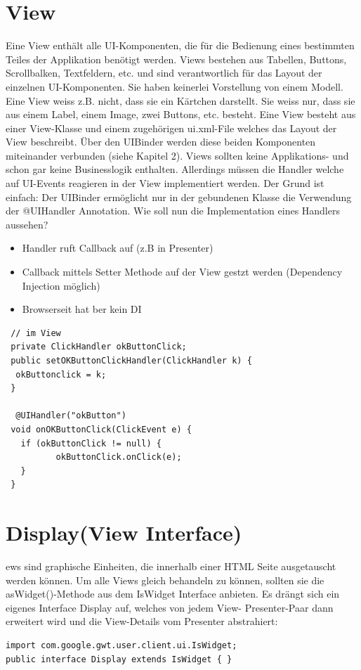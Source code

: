 \documentclass[a4paper,10pt]{scrreprt}
\begin{document}
\section{View}
Eine View enthält alle UI-Komponenten, die für die Bedienung eines bestimmten Teiles der
Applikation benötigt werden. Views bestehen aus Tabellen, Buttons, Scrollbalken, Textfeldern, etc.
und sind verantwortlich für das Layout der einzelnen UI-Komponenten. Sie haben keinerlei Vorstellung
von einem Modell. Eine View weiss z.B. nicht, dass sie ein Kärtchen darstellt. Sie weiss nur, dass sie aus
einem Label, einem Image, zwei Buttons, etc. besteht.
Eine View besteht aus einer View-Klasse und einem zugehörigen ui.xml-File welches das Layout der
View beschreibt. Über den UIBinder werden diese beiden Komponenten miteinander verbunden
(siehe Kapitel 2).
Views sollten keine Applikations- und schon gar keine Businesslogik enthalten. Allerdings müssen die
Handler welche auf UI-Events reagieren in der View implementiert werden. Der Grund ist einfach: Der
UIBinder ermöglicht nur in der gebundenen Klasse die Verwendung der @UIHandler Annotation.
Wie soll nun die Implementation eines Handlers aussehen?

\begin{itemize}
 \item Handler ruft Callback auf (z.B in Presenter)
 \item Callback mittels Setter Methode auf der View gestzt werden (Dependency Injection möglich)
 \item Browserseit hat ber kein DI
\end{itemize}
\begin{lstlisting}
 // im View
 private ClickHandler okButtonClick;
 public setOKButtonClickHandler(ClickHandler k) {
  okButtonclick = k;
 }
 
  @UIHandler("okButton")
 void onOKButtonClick(ClickEvent e) {
   if (okButtonClick != null) {
          okButtonClick.onClick(e);   
   }
 }
\end{lstlisting}

\section{Display(View Interface)}

ews sind graphische Einheiten, die innerhalb einer HTML Seite ausgetauscht werden können. Um
alle Views gleich behandeln zu können, sollten sie die asWidget()-Methode aus dem IsWidget
Interface anbieten. Es drängt sich ein eigenes Interface Display auf, welches von jedem View-
Presenter-Paar dann erweitert wird und die View-Details vom Presenter abstrahiert:
\begin{lstlisting}
import com.google.gwt.user.client.ui.IsWidget;
public interface Display extends IsWidget { }
\end{lstlisting}
\end{document}
